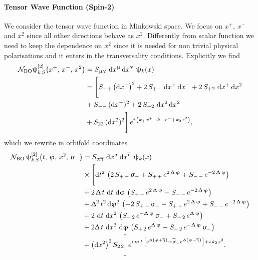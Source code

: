 \paragraph{Tensor Wave Function (Spin-2)}

We consider the tensor wave function in Minkowski space.
We focus on $x^+,\, x^-$ and $x^2$ since all other directions behave as $x^2$.
Differently from scalar function we need to keep the dependence on $x^2$ since it is needed for non trivial physical polarisations and it enters in the transversality conditions.
Explicitly we find
\begin{equation}
  \begin{split}
    \mathcal{N}_{\text{BO}}
    \uppsi^{[2]}_{k\, S}\qty(x^+,\, x^-,\, x^2)
    & =
    S_{\upmu\upnu}\,
    \dd{x}^{\upmu} \dd{x}^{\upnu}\,
    \uppsi_k(x)
    \\
    & =
    \Biggl[
      S_{++}\, \qty(\dd{x^+})^2  
      +
      2\, S_{+-}\, \dd{x^+} \dd{x^-}
      +
      2\, S_{+2}\, \dd{x^+}  \dd{x^2}
      \\
      & +
      S_{--}\, (\dd{x^-})^2
      +
      2\, S_{-2}\, \dd{x^2} \dd{x^2}
      \\
      & +
      S_{22}\, (\dd{x^2})^2
    \Biggr]\,
    e^{i\, \qty( k_+ x^+ + k_- x^- + k_2 x^2 )},
  \end{split}
\end{equation}
which we rewrite in orbifold coordinates 
\begin{equation}
  \begin{split}
    \cN_{\text{BO}}\,
    \psi^{[2]}_{k\,S}\qty(t,\, \varphi,\, x^2,\, \sigma_-)
    & =
    S_{\alpha\beta}\,
    \dd{x}^{\alpha} \dd{x}^{\beta}\,
    \psi_k(x)
    \\
    & \times
    \Biggl[
      \dss[2]{t}\,
      \qty(%
        2\, S_{+\,-}\, \sigma_-
        +
        S_{+\,+}\, e^{2\,\Delta\, \varphi}
        +
        S_{-\,-}\, e^{- 2\,\Delta\, \varphi}
      )
      \\
      & +
      2\, \Delta\, t\,
      \dd{t}\, \dd{\varphi}\,
      \qty(%
        S_{+\,+}\, e^{2\,\Delta\, \varphi}
        -
        S_{-\,-}\, e^{-2\,\Delta\, \varphi}
      )
      \\
      & +
      \Delta^2\, t^2
      \dss[2]{\varphi}\,
      \qty(%
        -2\, S_{+\,-}\, \sigma_-
        +
        S_{+\,+}\, e^{2\,\Delta\, \varphi}
        +
        S_{-\,-}\, e^{- 2\, \Delta\, \varphi}
      )
      \\
      & +
      2\, \dd{t}\, \dd{x^2}\,
      \qty(%
        S_{-\,2}\,e^ {- \Delta\,\varphi }\,\sigma_-
        +
        S_{+\,2}\, e^{\Delta\,\varphi}
      )
      \\
      & +
      2 \Delta\, t\,
      \dd{x^2}\, \dd{\varphi}\,
      \qty(%
        S_{+\,2}\, e^{\Delta\, \varphi}
        -
        S_{-\,2}\, e^{-\Delta\, \varphi}\, \sigma_-
      )
      \\
      & +
      \qty(\dd{x^2})^2\, S_{2\,2}
    \Biggr]
    e^{%
      i\, m\, t\, \qty[%
        e^{\Delta \qty( \varphi + \beta )}
        +
        \hsigma_- e^{\Delta \qty( \varphi - \beta )}
      ]
      + i\, k_2 x^2
    }.
  \end{split}
\end{equation}

